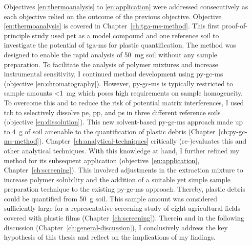 Objectives \ref{en:thermoanalysis} to \ref{en:application} were addressed consecutively as each objective relied on the outcome of the previous objective. Objective \ref{en:thermoanalysis} is covered in Chapter~\ref{ch:tga-ms-method}. This first proof-of-principle study used \ac{pet} as a model compound and one reference soil to investigate the potential of \ac{tga-ms} for plastic quantification. The method was designed to enable the rapid analysis of \SI{50}{\milli\gram} soil without any sample preparation. To facilitate the analysis of polymer mixtures and increase instrumental sensitivity, I continued method development using \ac{py-gc-ms} (objective \ref{en:chromatography}). However, \ac{py-gc-ms} is typically restricted to sample amounts \SI{<1}{\milli\gram} which poses high requirements on sample homogeneity. To overcome this and to reduce the risk of potential matrix interferences, I used \acf{tcb} to selectively dissolve \ac{pe}, \ac{pp}, and \ac{ps} in three different reference soils (objective \ref{en:dissolution}). This new solvent-based \ac{py-gc-ms} approach made up to \SI{4}{g} of soil amenable to the quantification of plastic debris (Chapter~\ref{ch:py-gc-ms-method}). Chapter~\ref{ch:analytical-techniques} critically (re-)evaluates this and other analytical techniques. With this knowledge at hand, I further refined my method for its subsequent application (objective~\ref{en:application}, Chapter~\ref{ch:screening}). This involved adjustments in the extraction mixture to increase polymer solubility and the addition of a suitable yet simple sample preparation technique to the existing \ac{py-gc-ms} approach. Thereby, plastic debris could be quantified from \SI{50}{\gram} soil. This sample amount was considered sufficiently large for a representative screening study of eight agricultural fields covered with plastic films (Chapter~\ref{ch:screening}). Therein and in the following discussion (Chapter~\ref{ch:general-discussion}), I conclusively address the key hypothesis of this thesis and reflect on the implications of my findings.
